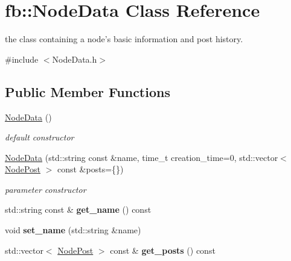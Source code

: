 \hypertarget{classfb_1_1_node_data}{\section{fb\+:\+:Node\+Data Class Reference}
\label{classfb_1_1_node_data}
}


the class containing a node's basic information and post history.  




{\ttfamily \#include $<$Node\+Data.\+h$>$}

\subsection*{Public Member Functions}
\begin{DoxyCompactItemize}
\item 
\hypertarget{classfb_1_1_node_data_af784d2cb623aef4b31514fbe37512a5d}{\hyperlink{classfb_1_1_node_data_af784d2cb623aef4b31514fbe37512a5d}{Node\+Data} ()}\label{classfb_1_1_node_data_af784d2cb623aef4b31514fbe37512a5d}

\begin{DoxyCompactList}\small\item\em default constructor \end{DoxyCompactList}\item 
\hyperlink{classfb_1_1_node_data_abe279b5d0d097b73124eba83b9ce0cab}{Node\+Data} (std\+::string const \&name, time\+\_\+t creation\+\_\+time=0, std\+::vector$<$ \hyperlink{structfb_1_1_node_post}{Node\+Post} $>$ const \&posts=\{\})
\begin{DoxyCompactList}\small\item\em parameter constructor \end{DoxyCompactList}\item 
\hypertarget{classfb_1_1_node_data_a4377f6518c8bbd10257dd2bf586d19c2}{std\+::string const \& {\bfseries get\+\_\+name} () const }\label{classfb_1_1_node_data_a4377f6518c8bbd10257dd2bf586d19c2}

\item 
\hypertarget{classfb_1_1_node_data_ab27858fd3d554fc73cf579485e4a6794}{void {\bfseries set\+\_\+name} (std\+::string \&name)}\label{classfb_1_1_node_data_ab27858fd3d554fc73cf579485e4a6794}

\item 
\hypertarget{classfb_1_1_node_data_a3b2687e4867f4c649d9774cf9f41cea1}{std\+::vector$<$ \hyperlink{structfb_1_1_node_post}{Node\+Post} $>$ const \& {\bfseries get\+\_\+posts} () const }\label{classfb_1_1_node_data_a3b2687e4867f4c649d9774cf9f41cea1}


\end{DoxyCompactItemize}

